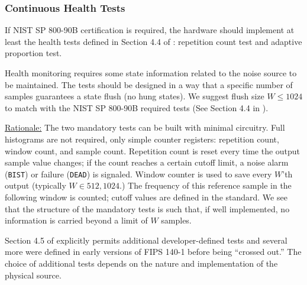 \subsubsection{Continuous Health Tests}
\label{sec:cont-tests}

    If NIST SP 800-90B certification is required, the hardware
    should implement at least the health tests defined in Section
    4.4 of \cite{TuBaKe+18}: repetition count test and adaptive
    proportion test.

    Health monitoring requires some state information related
    to the noise source to be maintained. The tests should be designed
    in a way that a specific number of samples guarantees a state
    flush (no hung states). We suggest flush size $W \leq 1024$ to
    match with the NIST SP 800-90B required tests (See Section 4.4 in
    \cite{TuBaKe+18}).

    \underline{Rationale:}
    The two mandatory tests can be built with minimal circuitry.
    Full histograms are not required, only simple counter registers:
    repetition count, window count, and sample count.
    Repetition count is reset every time the output sample value
    changes; if the count reaches a certain cutoff limit, a noise alarm
    (\verb|BIST|) or failure (\verb|DEAD|) is signaled.
    Window counter is used to save every $W$'th output (typically
    $W \in { 512, 1024 }$.) The frequency of this
    reference sample in the following window is counted; cutoff values
    are defined in the standard. We see that the structure of the
    mandatory tests is such that, if well implemented, no information is
    carried beyond a limit of $W$ samples.

    Section 4.5 of \cite{TuBaKe+18} explicitly permits additional
    developer-defined tests and several more were defined in early
    versions of FIPS 140-1 before being ``crossed out.'' The choice
    of additional tests depends on the nature and implementation of the
    physical source.

